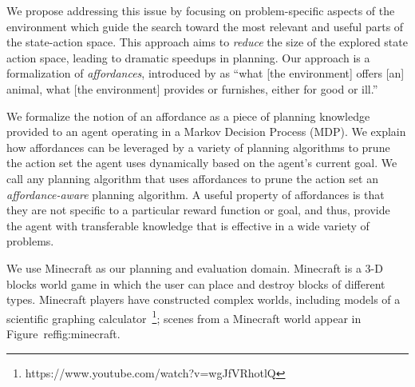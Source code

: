 \documentclass[]{article}
\begin{document}
We propose addressing this issue by focusing on
problem-specific aspects of the environment which guide the search
toward the most relevant and useful parts of the state-action space.
This approach aims to {\em reduce} the size of the explored state
action space, leading to dramatic speedups in planning.  Our approach
is a formalization of {\em affordances}, introduced by
\citet{gibson77} as ``what [the environment] offers [an] animal, what
      [the environment] provides or furnishes, either for good or
      ill.''  
      
      We formalize the notion of an affordance as a piece of
      planning knowledge provided to an agent operating in a Markov
      Decision Process (MDP). We explain how affordances can be
      leveraged by a variety of planning algorithms to prune the
      action set the agent uses dynamically based on the agent's
      current goal.  We call any planning algorithm that uses
      affordances to prune the action set an {\it affordance-aware} planning
      algorithm.  A useful property of affordances is that they are
      not specific to a particular reward function or goal, and thus,
      provide the agent with transferable knowledge that is effective
      in a wide variety of problems.




We use Minecraft as our planning and evaluation domain. Minecraft is a
3-D blocks world game in which the user can place and destroy blocks
of different types.  Minecraft players have constructed complex
worlds, including models of a scientific graphing
calculator~\footnote{https://www.youtube.com/watch?v=wgJfVRhotlQ};
scenes from a Minecraft world appear in Figure~ref{fig:minecraft}.  
\end{document}
